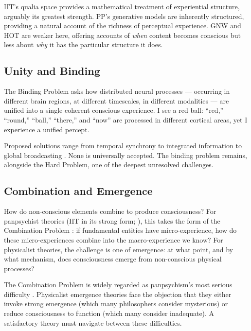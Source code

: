 \documentclass[12pt]{article}
\begin{document}
IIT's qualia space provides a mathematical treatment of experiential structure, arguably its greatest strength. PP's generative models are inherently structured, providing a natural account of the richness of perceptual experience. GNW and HOT are weaker here, offering accounts of \emph{when} content becomes conscious but less about \emph{why} it has the particular structure it does.


\subsection{Unity and Binding}


The Binding Problem \citep{Treisman1996,Revonsuo1999} asks how distributed neural processes --- occurring in different brain regions, at different timescales, in different modalities --- are unified into a single coherent conscious experience. I see a red ball: ``red,'' ``round,'' ``ball,'' ``there,'' and ``now'' are processed in different cortical areas, yet I experience a unified percept.

Proposed solutions range from temporal synchrony \citep{Gray1989,Singer1995,Fries2005,Fries2015} to integrated information \citep{Tononi2004} to global broadcasting \citep{Baars1988}. None is universally accepted. The binding problem remains, alongside the Hard Problem, one of the deepest unresolved challenges.


\subsection{Combination and Emergence}


How do non-conscious elements combine to produce consciousness? For panpsychist theories (IIT in its strong form; \citealp{Goff2019,Strawson2006}), this takes the form of the Combination Problem \citep{James1890,Chalmers2016}: if fundamental entities have micro-experience, how do these micro-experiences combine into the macro-experience we know? For physicalist theories, the challenge is one of emergence: at what point, and by what mechanism, does consciousness emerge from non-conscious physical processes?

The Combination Problem is widely regarded as panpsychism's most serious difficulty \citep{Chalmers2016,Coleman2014}. Physicalist emergence theories face the objection that they either invoke strong emergence (which many philosophers consider mysterious) or reduce consciousness to function (which many consider inadequate). A satisfactory theory must navigate between these difficulties.
\end{document}
